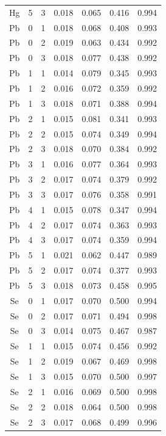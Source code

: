 \documentclass[ms, hidelinks]{uncgdissertationexp}
\theoremstyle{plain}
\theoremstyle{definition}
\theoremstyle{remark}
\begin{document}
\begin{longtable}{ccccccc}
Hg & 5 & 3 & 0.018 & 0.065 & 0.416 & 0.994\\
\rowcolor{gray!6}  Pb & 0 & 1 & 0.018 & 0.068 & 0.408 & 0.993\\
Pb & 0 & 2 & 0.019 & 0.063 & 0.434 & 0.992\\
\rowcolor{gray!6}  Pb & 0 & 3 & 0.018 & 0.077 & 0.438 & 0.992\\
Pb & 1 & 1 & 0.014 & 0.079 & 0.345 & 0.993\\
\rowcolor{gray!6}  Pb & 1 & 2 & 0.016 & 0.072 & 0.359 & 0.992\\
Pb & 1 & 3 & 0.018 & 0.071 & 0.388 & 0.994\\
\rowcolor{gray!6}  Pb & 2 & 1 & 0.015 & 0.081 & 0.341 & 0.993\\
Pb & 2 & 2 & 0.015 & 0.074 & 0.349 & 0.994\\
\rowcolor{gray!6}  Pb & 2 & 3 & 0.018 & 0.070 & 0.384 & 0.992\\
Pb & 3 & 1 & 0.016 & 0.077 & 0.364 & 0.993\\
\rowcolor{gray!6}  Pb & 3 & 2 & 0.017 & 0.074 & 0.379 & 0.992\\
Pb & 3 & 3 & 0.017 & 0.076 & 0.358 & 0.991\\
\rowcolor{gray!6}  Pb & 4 & 1 & 0.015 & 0.078 & 0.347 & 0.994\\
Pb & 4 & 2 & 0.017 & 0.074 & 0.363 & 0.993\\
\rowcolor{gray!6}  Pb & 4 & 3 & 0.017 & 0.074 & 0.359 & 0.994\\
Pb & 5 & 1 & 0.021 & 0.062 & 0.447 & 0.989\\
\rowcolor{gray!6}  Pb & 5 & 2 & 0.017 & 0.074 & 0.377 & 0.993\\
Pb & 5 & 3 & 0.018 & 0.073 & 0.458 & 0.995\\
\rowcolor{gray!6}  Se & 0 & 1 & 0.017 & 0.070 & 0.500 & 0.994\\
Se & 0 & 2 & 0.017 & 0.071 & 0.494 & 0.998\\
\rowcolor{gray!6}  Se & 0 & 3 & 0.014 & 0.075 & 0.467 & 0.987\\
Se & 1 & 1 & 0.015 & 0.074 & 0.456 & 0.992\\
\rowcolor{gray!6}  Se & 1 & 2 & 0.019 & 0.067 & 0.469 & 0.998\\
Se & 1 & 3 & 0.015 & 0.070 & 0.500 & 0.997\\
\rowcolor{gray!6}  Se & 2 & 1 & 0.016 & 0.069 & 0.500 & 0.998\\
Se & 2 & 2 & 0.018 & 0.064 & 0.500 & 0.998\\
\rowcolor{gray!6}  Se & 2 & 3 & 0.017 & 0.068 & 0.499 & 0.996\\

\end{longtable}
\end{document}
